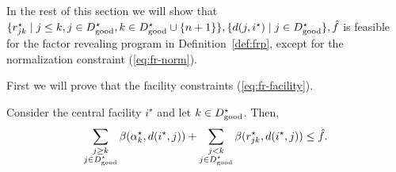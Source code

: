 In the rest of this section we will show that $\{r^\star_{jk} \mid j \leq k, j \in D^\star_{\mathrm{good}}, k \in D^\star_{\mathrm{good}} \cup \{n + 1\}\}, \{d(j, i^\star) \mid j \in D^\star_{\mathrm{good}}\}, \hat f$ is feasible for the factor revealing program in Definition~\ref{def:frp}, except for the normalization constraint (\ref{eq:fr-norm}).

First we will prove that the facility constraints (\ref{eq:fr-facility}).
\begin{lemma}
\label{lem:fr-facility-robust}
    Consider the central facility $i^\star$ and let $k \in D^\star_{\mathrm{good}}$. Then,
    \[
        \sum_{\substack{j \ge k\\ j \in D^\star_{\mathrm{good}}}} \beta(\alpha^\star_k, d(i^\star,j)) + \sum_{\substack{j < k\\ j \in D^\star_{\mathrm{good}}}} \beta(r^\star_{jk}, d(i^\star,j)) \le \hat f.
    \]
\end{lemma}

